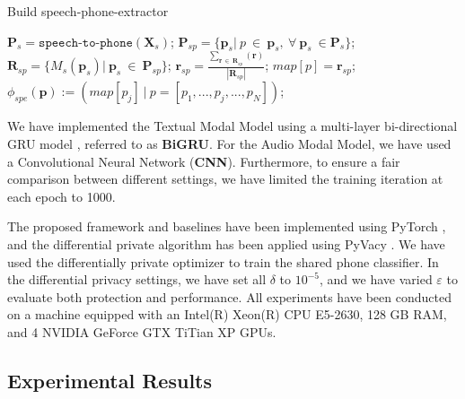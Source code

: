 \documentclass[11pt]{article}
\begin{document}
\begin{algorithm}[!htp]
\begin{algorithmic}[1]
	\caption{Build speech-phone-extractor}              
	\label{alg:build-spe}
		\STATE $\mathbf{P}_s = \texttt{speech-to-phone}(\mathbf{X}_s)$;
		    \STATE  $\mathbf{P}_{sp} = \{\mathbf{p}_s|~p~\in~\mathbf{p}_s,~\forall~\mathbf{p}_s~\in  \mathbf{P}_s\}$;
		    \STATE $\mathbf{R}_{sp} = \{M_s(\mathbf{p}_s)|~\mathbf{p}_s~\in~\mathbf{P}_{sp}\}$;
		    \STATE  $\mathbf{r}_{sp} = \frac{\sum_{\mathbf{r}~\in~\mathbf{R}_{sp}}(\mathbf{r})}{|\mathbf{R}_{sp}|}$;
		    \STATE  $map[p]=\mathbf{r}_{sp}$;
		\ENDFOR
		\STATE $\phi_{spe}(\mathbf{p}):=\left(map[p_j]~|~p=[p_1,...,p_j,...,p_N]\right)$;
\end{algorithmic}  
\end{algorithm}

We have implemented the Textual Modal Model using a multi-layer bi-directional GRU model \cite{chung2014empirical}, referred to as \textbf{BiGRU}. For the Audio Modal Model, we have used a Convolutional Neural Network \cite{kim2014convolutional} (\textbf{CNN}). Furthermore, to ensure a fair comparison between different settings, we have limited the training iteration at each epoch to 1000.

The proposed framework and baselines have been implemented using PyTorch \cite{paszke2017automatic}, and the differential private algorithm has been applied using PyVacy \cite{waites2019pyvacy}. We have used the differentially private optimizer \cite{abadi2016deep} to train the shared phone classifier. In the differential privacy settings, we have set all $\delta$ to $10^{-5}$, and we have varied $\varepsilon$ to evaluate both protection and performance. All experiments have been conducted on a machine equipped with an Intel(R) Xeon(R) CPU E5-2630, 128 GB RAM, and 4 NVIDIA GeForce GTX TiTian XP GPUs.

\subsection{Experimental Results}
\end{document}
